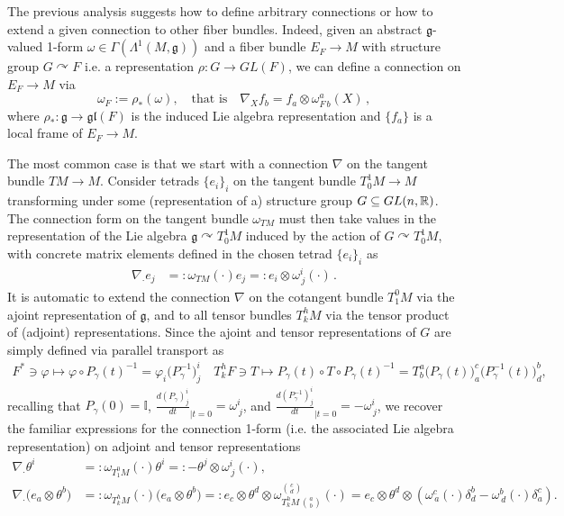 \documentclass[../geometry_main.tex]{subfiles}
\begin{document}
\begin{mytheorem}
The previous analysis suggests how to define arbitrary connections or how to extend a given connection to other fiber bundles.
Indeed, given an abstract $\mathfrak{g}$-valued 1-form $\omega\in \Gamma\left(\Lambda^1(M,\mathfrak{g})\right)$ and a fiber bundle $E_F\to M$ with structure group $G\curvearrowright F$ i.e. a representation $\rho: G \to GL(F)$, we can define a connection on $E_F\to M$ via
\begin{equation}
    \omega_F := \rho_*(\omega), \quad \text{that is}\quad \nabla_X f_b = f_a \otimes \omega^a_{F\, b}(X)\,,
\end{equation}
where $\rho_*: \mathfrak{g} \to \mathfrak{gl}(F)$ is the induced Lie algebra representation and $\{f_a\}$ is a local frame of $E_F\to M$.

The most common case is that we start with a connection $\nabla$ on the tangent bundle $TM\to M$.
Consider tetrads $\{e_i\}_i$ on the tangent bundle $T^1_0M\to M$ transforming under some (representation of a) structure group $G\subseteq GL(n,\mathbb{R})$.
The connection form on the tangent bundle $\omega_{TM}$ must then take values in the representation of the Lie algebra $\mathfrak{g}\curvearrowright T^1_0M$ induced by the action of $G \curvearrowright T^1_0M$, with concrete matrix elements defined in the chosen tetrad $\{e_i\}_i$ as
\begin{align}
    \nabla_\cdot e_j &=: \omega_{TM}(\cdot) e_j =: e_i \otimes \omega^i_{\, j}(\cdot)\,.
\end{align}
It is automatic to extend the connection $\nabla$ on the cotangent bundle $T^0_1M$ via the ajoint representation of $\mathfrak{g}$, and to all tensor bundles $T^h_k M$ via the tensor product of (adjoint) representations.
Since the ajoint and tensor representations of $G$ are simply defined via parallel transport as
\begin{align}
    F^*\ni \varphi \mapsto \varphi\circ P_\gamma(t)^{-1}= \varphi_i\big(P_\gamma^{-1}\big)^i_j\quad  T^h_k F \ni T \mapsto P_\gamma(t) \circ T \circ P_\gamma(t)^{-1} = T^a_b \big(P_\gamma(t)\big)^c_a \big(P_\gamma^{-1}(t)\big)^b_d,
\end{align}
recalling that $P_\gamma(0)=\mathbb{I}$, $\frac{d(P_\gamma)^i_j}{dt}_{\mid t=0} = \omega^i_{\, j}$, and $\frac{d(P_\gamma^{-1})^i_j}{dt}_{\mid t=0} = - \omega^i_{\, j}$, we recover the familiar expressions for the connection 1-form (i.e. the associated Lie algebra representation) on adjoint and tensor representations
\begin{align}
    \nabla_\cdot \theta^i &=: \omega_{T^0_1M}(\cdot) \theta^i=: -\theta^j \otimes \omega^i_{\, j}(\cdot),\\
    \nabla_\cdot \big(e_a\otimes \theta^b\big) &=: \omega_{T^h_k M}(\cdot) \big(e_a\otimes \theta^b\big) =: e_c \otimes \theta^d \otimes \omega^{\binom{c}{d}}_{T^h_k M\, \binom{a}{b}}(\cdot) = e_c \otimes \theta^d \otimes \left( \omega^c_{\, a}(\cdot) \delta^b_d -\omega^b_{\, d}(\cdot) \delta^c_a\right).
\end{align}


\end{mytheorem}
\end{document}
